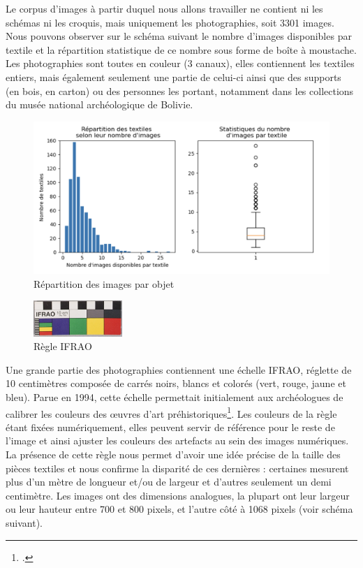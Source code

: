 \noindent Le corpus d'images à partir duquel nous allons travailler ne contient ni les schémas ni les croquis, mais uniquement les photographies, soit 3301 images. Nous pouvons observer sur le schéma suivant le nombre d'images disponibles par textile et la répartition statistique de ce nombre sous forme de boîte à moustache. Les photographies sont toutes en couleur (3 canaux), elles contiennent les textiles entiers, mais également seulement une partie de celui-ci ainsi que des supports (en bois, en carton) ou des personnes les portant, notamment dans les collections du musée national archéologique de Bolivie. 

\begin{figure}[!h]
	\begin{center}
		\includegraphics[width=16cm]{../images/nbImages.png}
	 \end{center}
	 \caption{Répartition des images par objet}
\end{figure}

\begin{figure}
    \centering
    \includegraphics[width=0.3\textwidth]{../images/IFRAO.jpg}
    \caption{Règle IFRAO}
    \label{fig:IFRAO}
\end{figure}



Une grande partie des photographies contiennent une échelle IFRAO, réglette de 10 centimètres composée de carrés noirs, blancs et colorés (vert, rouge, jaune et bleu). Parue en 1994, cette échelle permettait initialement aux archéologues de calibrer les couleurs des \oe{}uvres d'art préhistoriques\footcite[p.~225]{lopezIFRAOStandardScale2009}. Les couleurs de la règle étant fixées numériquement, elles peuvent servir de référence pour le reste de l'image et ainsi ajuster les couleurs des artefacts au sein des images numériques. La présence de cette règle nous permet d'avoir une idée précise de la taille des pièces textiles et nous confirme la disparité de ces dernières : certaines mesurent plus d'un mètre de longueur et/ou de largeur et d'autres seulement un demi centimètre. Les images ont des dimensions analogues, la plupart ont leur largeur ou leur hauteur entre 700 et 800 pixels, et l'autre côté à 1068 pixels (voir schéma suivant).

